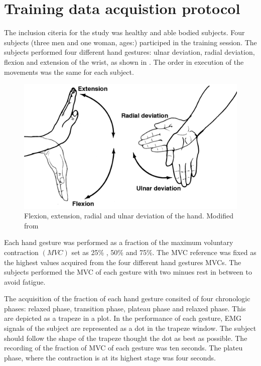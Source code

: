 \section{Training data acquistion protocol}

The inclusion citeria for the study was healthy and able bodied subjects. Four subjects (three men and one woman, ages:) participed in the training session. The subjects performed four different hand gestures: ulnar deviation, radial deviation, flexion and extension of the wrist, as shown in . The order in execution of the movements was the same for each subject.

\begin{figure}[H]                    
	\includegraphics[width=.5\textwidth]{figures/Anatomy/wrist_move}  %
	\caption{Flexion, extension, radial and ulnar deviation of the hand. Modified from  \cite{hamilton2008}}
	\label{fig:handgest}  %
\end{figure}


Each hand gesture was performed as a fraction of the maximum voluntary contraction $\left( MVC\right)$ set as 25\% , 50\% and 75\%. The MVC reference was fixed as the highest values acquired from the four different hand gestures MVCs. The subjects performed the MVC of each gesture with two minues rest in between to avoid fatigue.

The acquisition of the fraction of each hand gesture consited of four chronologic phases: relaxed phase, transition phase, plateau phase and relaxed phase. This are depicted as a trapeze in a plot. In the performance of each gesture, EMG signals of the subject are represented as a dot in the trapeze window. The subject should follow the shape of the trapeze thought the dot as best as possible. The recording of the fraction of MVC of each gesture was ten seconds. The plateu phase, where the contraction is at its highest stage was four seconds.
  
